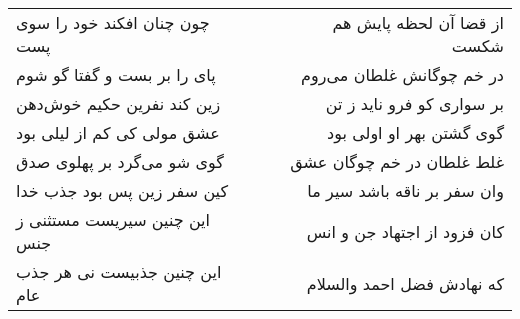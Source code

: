 \begin{center}
\begin{longtable}{l p{0.5cm} r}
\\
چون چنان افکند خود را سوی پست
&&
از قضا آن لحظه پایش هم شکست
\\
پای را بر بست و گفتا گو شوم
&&
در خم چوگانش غلطان می‌روم
\\
زین کند نفرین حکیم خوش‌دهن
&&
بر سواری کو فرو ناید ز تن
\\
عشق مولی کی کم از لیلی بود
&&
گوی گشتن بهر او اولی بود
\\
گوی شو می‌گرد بر پهلوی صدق
&&
غلط غلطان در خم چوگان عشق
\\
کین سفر زین پس بود جذب خدا
&&
وان سفر بر ناقه باشد سیر ما
\\
این چنین سیریست مستثنی ز جنس
&&
کان فزود از اجتهاد جن و انس
\\
این چنین جذبیست نی هر جذب عام
&&
که نهادش فضل احمد والسلام
\\
\end{longtable}
\end{center}
